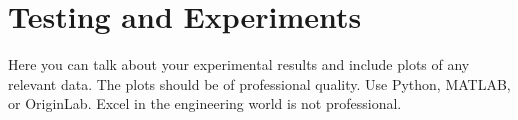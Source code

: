 \section{Testing and Experiments}
Here you can talk about your experimental results and include plots of any relevant data. The plots should be of professional quality. Use Python, MATLAB, or OriginLab. Excel in the engineering world is not professional. 
